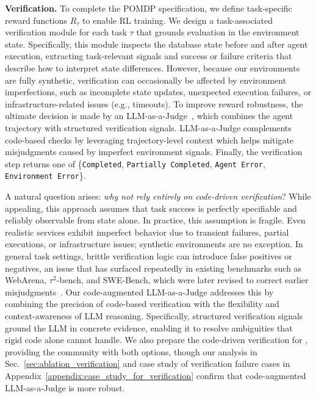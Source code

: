 \documentclass{article}
\theoremstyle{plain}
\theoremstyle{definition}
\theoremstyle{remark}
\newcommand{\synth}{\textls{\textsc{AWM}}\xspace}
\newcommand{\taubench}{$\tau^2$-bench\xspace}
\newcommand{\myparagraph}[1]{\noindent\textbf{#1}}
\begin{document}
\myparagraph{Verification.} \label{sec:verification_synthesis}
To complete the POMDP specification, we define task-specific reward functions $R_{\tau}$ to enable RL training.
We design a task-associated verification module for each task $\tau$ that grounds evaluation in the environment state.
Specifically, this module inspects the database state before and after agent execution, extracting task-relevant signals and success or failure criteria that describe how to interpret state differences.
However, because our environments are fully synthetic, verification can occasionally be affected by environment imperfections, such as incomplete state updates, unexpected execution failures, or infrastructure-related issues (e.g., timeouts).
To improve reward robustness, the ultimate decision is made by an LLM-as-a-Judge~\citep{llmasajudge}, which combines the agent trajectory with structured verification signals.
LLM-as-a-Judge complements code-based checks by leveraging trajectory-level context which helps mitigate misjudgments caused by imperfect environment signals.
Finally, the verification step returns one of \{\texttt{Completed}, \texttt{Partially Completed}, \texttt{Agent Error}, \texttt{Environment Error}\}.

A natural question arises: \textit{why not rely entirely on code-driven verification}? 
While appealing, this approach assumes that task success is perfectly specifiable and reliably observable from state alone.
In practice, this assumption is fragile.
Even realistic services exhibit imperfect behavior due to transient failures, partial executions, or infrastructure issues; synthetic environments are no exception.
In general task settings, brittle verification logic can introduce false positives or negatives, an issue that has surfaced repeatedly in existing benchmarks such as WebArena, \taubench, and SWE-Bench, which were later revised to correct earlier misjudgments~\citep{hattami2025webarena,verified_tau2,openai2024swebenchverified}.
Our code-augmented LLM-as-a-Judge addresses this by combining the precision of code-based verification with the flexibility and context-awareness of LLM reasoning.
Specifically, structured verification signals ground the LLM in concrete evidence, enabling it to resolve ambiguities that rigid code alone cannot handle.
We also prepare the code-driven verification for \synth, providing the community with both options, though our analysis in Sec.~\ref{sec:ablation_verification} and case study of verification failure cases in Appendix~\ref{appendix:case_study_for_verification} confirm that code-augmented LLM-as-a-Judge is more robust.
\end{document}
